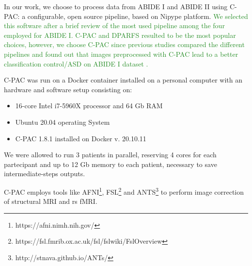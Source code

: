 \documentclass[11pt]{report}
\begin{document}
In our work, we choose to process data from ABIDE I and ABIDE II using C-PAC: a configurable, open source pipeline, based on Nipype platform.
\textcolor{ForestGreen}{We selected this software after a brief review of the most used pipeline among the four employed for ABIDE I. C-PAC and DPARFS resulted to be the most popular choices, however, we choose C-PAC since previous studies compared the different pipelines and found out that images preprocessed with C-PAC lead to a better classification control/ASD on ABIDE I dataset \cite{yang2020}.}

C-PAC was run on a Docker container installed on a personal computer with an hardware and software setup consisting on:
\begin{itemize}
\item 16-core Intel i7-5960X processor and 64 Gb RAM
\item Ubuntu 20.04 operating System
\item C-PAC 1.8.1 installed on Docker v. 20.10.11
\end{itemize}

We were allowed to run 3 patients in parallel, reserving 4 cores for each partecipant and up to 12 Gb memory to each patient, necessary to save intermediate-steps outputs.

C-PAC employs tools like AFNI\footnote{https://afni.nimh.nih.gov/}, FSL\footnote{https://fsl.fmrib.ox.ac.uk/fsl/fslwiki/FslOverview} and ANTS\footnote{http://stnava.github.io/ANTs/} to perform image correction of structural MRI and rs fMRI.
\end{document}
